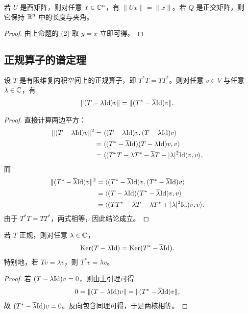 \begin{corollary}
若 $U$ 是酉矩阵，则对任意 $x\in\mathbb{C}^n$，有 $\|Ux\|=\|x\|$。若 $Q$ 是正交矩阵，则它保持 $\mathbb{R}^n$ 中的长度与夹角。
\end{corollary}

\begin{proof}
由上命题的 (2) 取 $y=x$ 立即可得。
\end{proof}

\subsection{正规算子的谱定理}

\begin{lemma}
设 $T$ 是有限维复内积空间上的正规算子，即 $T^*T=TT^*$。则对任意 $v\in V$ 与任意 $\lambda\in\mathbb{C}$，有
\[
\|(T-\lambda\mathrm{Id})v\|=\|(T^*-\overline{\lambda}\mathrm{Id})v\|.
\]
\end{lemma}

\begin{proof}
直接计算两边平方：
\begin{align*}
\|(T-\lambda\mathrm{Id})v\|^2
&=\langle (T-\lambda\mathrm{Id})v, (T-\lambda\mathrm{Id})v \rangle\\
&=\langle (T^*-\overline{\lambda}\mathrm{Id})(T-\lambda\mathrm{Id})v, v \rangle\\
&=\langle (T^*T-\lambda T^*-\overline{\lambda}T+|\lambda|^2\mathrm{Id})v, v \rangle,
\end{align*}
而
\begin{align*}
\|(T^*-\overline{\lambda}\mathrm{Id})v\|^2
&=\langle (T^*-\overline{\lambda}\mathrm{Id})v, (T^*-\overline{\lambda}\mathrm{Id})v \rangle\\
&=\langle (T-\lambda\mathrm{Id})(T^*-\overline{\lambda}\mathrm{Id})v, v \rangle\\
&=\langle (TT^*-\overline{\lambda}T-\lambda T^*+|\lambda|^2\mathrm{Id})v, v \rangle.
\end{align*}
由于 $T^*T=TT^*$，两式相等，因此结论成立。
\end{proof}

\begin{corollary}
若 $T$ 正规，则对任意 $\lambda\in\mathbb{C}$，
\[
\mathrm{Ker}(T-\lambda\mathrm{Id})=\mathrm{Ker}(T^*-\overline{\lambda}\mathrm{Id}).
\]
特别地，若 $Tv=\lambda v$，则 $T^*v=\overline{\lambda}v$。
\end{corollary}

\begin{proof}
若 $(T-\lambda\mathrm{Id})v=0$，则由上引理可得
\[
0=\|(T-\lambda\mathrm{Id})v\|=\|(T^*-\overline{\lambda}\mathrm{Id})v\|,
\]
故 $(T^*-\overline{\lambda}\mathrm{Id})v=0$。反向包含同理可得，于是两核相等。
\end{proof}

